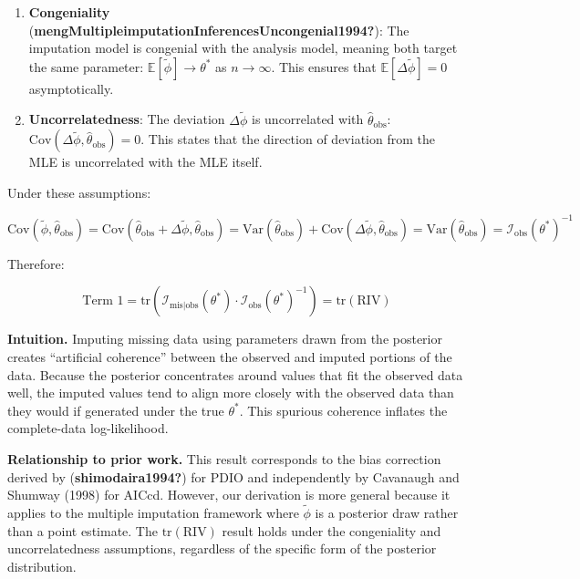 \documentclass[
]{article}
\begin{document}
\begin{enumerate}
\def\labelenumi{\arabic{enumi}.}
\item
  \textbf{Congeniality}
  (\textbf{mengMultipleimputationInferencesUncongenial1994?}): The
  imputation model is congenial with the analysis model, meaning both
  target the same parameter: \(\mathbb{E}[\tilde{\phi}] \to \theta^*\)
  as \(n \to \infty\). This ensures that
  \(\mathbb{E}[\Delta\tilde{\phi}] = 0\) asymptotically.
\item
  \textbf{Uncorrelatedness}: The deviation \(\Delta\tilde{\phi}\) is
  uncorrelated with \(\hat{\theta}_{\text{obs}}\):
  \(\text{Cov}(\Delta\tilde{\phi}, \hat{\theta}_{\text{obs}}) = 0\).
  This states that the direction of deviation from the MLE is
  uncorrelated with the MLE itself.
\end{enumerate}

Under these assumptions:

\[\text{Cov}(\tilde{\phi}, \hat{\theta}_{\text{obs}}) = \text{Cov}(\hat{\theta}_{\text{obs}} + \Delta\tilde{\phi}, \hat{\theta}_{\text{obs}}) = \text{Var}(\hat{\theta}_{\text{obs}}) + \text{Cov}(\Delta\tilde{\phi}, \hat{\theta}_{\text{obs}}) = \text{Var}(\hat{\theta}_{\text{obs}}) = \mathcal{I}_{\text{obs}}(\theta^*)^{-1}\]

Therefore:

\[\text{Term 1} = \text{tr}\left(\mathcal{I}_{\text{mis}|\text{obs}}(\theta^*) \cdot \mathcal{I}_{\text{obs}}(\theta^*)^{-1}\right) = \text{tr}(\text{RIV})\]

\textbf{Intuition.} Imputing missing data using parameters drawn from
the posterior creates ``artificial coherence'' between the observed and
imputed portions of the data. Because the posterior concentrates around
values that fit the observed data well, the imputed values tend to align
more closely with the observed data than they would if generated under
the true \(\theta^*\). This spurious coherence inflates the
complete-data log-likelihood.

\textbf{Relationship to prior work.} This result corresponds to the bias
correction derived by (\textbf{shimodaira1994?}) for PDIO and
independently by Cavanaugh and Shumway (1998) for AICcd. However, our
derivation is more general because it applies to the multiple imputation
framework where \(\tilde{\phi}\) is a posterior draw rather than a point
estimate. The \(\text{tr}(\text{RIV})\) result holds under the
congeniality and uncorrelatedness assumptions, regardless of the
specific form of the posterior distribution.
\end{document}
